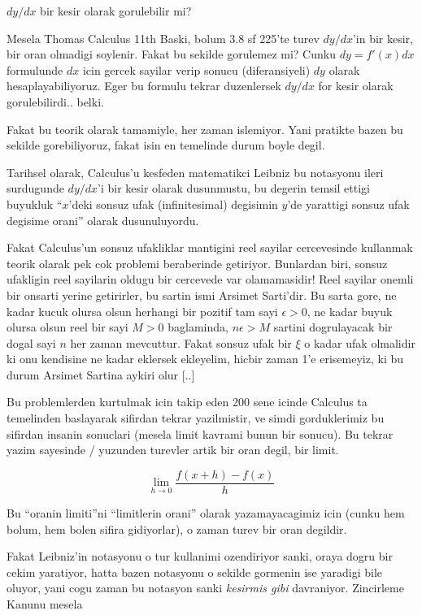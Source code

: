 \documentclass[12pt,fleqn]{article}
\begin{document}
$dy/dx$ bir kesir olarak gorulebilir mi? 

Mesela Thomas Calculus 11th Baski, bolum 3.8 sf 225'te turev $dy/dx$'in bir
kesir, bir oran olmadigi soylenir. Fakat bu sekilde gorulemez mi? Cunku $dy
= f'(x)dx$ formulunde $dx$ icin gercek sayilar verip sonucu (diferansiyeli)
$dy$ olarak hesaplayabiliyoruz. Eger bu formulu tekrar duzenlersek $dy/dx$
for kesir olarak gorulebilirdi.. belki.

Fakat bu teorik olarak tamamiyle, her zaman islemiyor. Yani pratikte bazen
bu sekilde gorebiliyoruz, fakat isin en temelinde durum boyle degil.

Tarihsel olarak, Calculus'u kesfeden matematikci Leibniz bu notasyonu ileri
surdugunde $dy/dx$'i bir kesir olarak dusunmustu, bu degerin temsil ettigi
buyukluk ``$x$'deki sonsuz ufak (infinitesimal) degisimin $y$'de yarattigi
sonsuz ufak degisime orani'' olarak dusunuluyordu.

Fakat Calculus'un sonsuz ufakliklar mantigini reel sayilar cercevesinde
kullanmak teorik olarak pek cok problemi beraberinde getiriyor. Bunlardan
biri, sonsuz ufakligin reel sayilarin oldugu bir cercevede var
olamamasidir! Reel sayilar onemli bir onsarti yerine getirirler, bu sartin
ismi Arsimet Sarti'dir. Bu sarta gore, ne kadar kucuk olursa olsun herhangi
bir pozitif tam sayi $\epsilon > 0$, ne kadar buyuk olursa olsun reel bir
sayi $M>0$ baglaminda, $n\epsilon > M$ sartini dogrulayacak bir dogal sayi
$n$ her zaman mevcuttur. Fakat sonsuz ufak bir $\xi$ o kadar ufak olmalidir
ki onu kendisine ne kadar eklersek ekleyelim, hicbir zaman 1'e erisemeyiz,
ki bu durum Arsimet Sartina aykiri olur [..]

Bu problemlerden kurtulmak icin takip eden 200 sene icinde Calculus ta
temelinden baslayarak sifirdan tekrar yazilmistir, ve simdi gorduklerimiz
bu sifirdan insanin sonuclari (mesela limit kavrami bunun bir sonucu). Bu
tekrar yazim sayesinde / yuzunden turevler artik bir oran degil, bir limit.

\[ \lim_{h \to 0} \frac{f(x+h) - f(x)}{h}\]

Bu ``oranin limiti''ni ``limitlerin orani'' olarak yazamayacagimiz icin
(cunku hem bolum, hem bolen sifira gidiyorlar), o zaman turev bir oran
degildir.

Fakat Leibniz'in notasyonu o tur kullanimi ozendiriyor sanki, oraya dogru
bir cekim yaratiyor, hatta bazen notasyonu o sekilde gormenin ise yaradigi
bile oluyor, yani cogu zaman bu notasyon sanki {\em kesirmis gibi}
davraniyor. Zincirleme Kanunu mesela 
\end{document}
